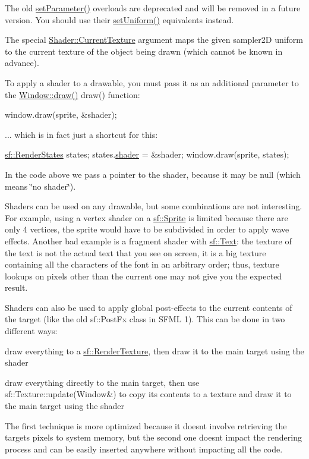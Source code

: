 The old \hyperlink{classsf_1_1_shader_a4d6ec78f6de1a0a2146c93ab09d7d762}{set\+Parameter()} overloads are deprecated and will be removed in a future version. You should use their \hyperlink{classsf_1_1_shader_abf78e3bea1e9b0bab850b6b0a0de29c7}{set\+Uniform()} equivalents instead.

The special \hyperlink{classsf_1_1_shader_ac84c7953eec2e19358ea6e2cc5385b8d}{Shader\+::\+Current\+Texture} argument maps the given {\ttfamily sampler2D} uniform to the current texture of the object being drawn (which cannot be known in advance).

To apply a shader to a drawable, you must pass it as an additional parameter to the \hyperlink{class_window_adfb2d5826942693e289d13f314a341f7}{Window\+::draw()} draw() function\+: 
\begin{DoxyCode}
window.draw(sprite, &shader);
\end{DoxyCode}


... which is in fact just a shortcut for this\+: 
\begin{DoxyCode}
\hyperlink{classsf_1_1_render_states}{sf::RenderStates} states;
states.\hyperlink{classsf_1_1_render_states_ad4f79ecdd0c60ed0d24fbe555b221bd8}{shader} = &shader;
window.draw(sprite, states);
\end{DoxyCode}


In the code above we pass a pointer to the shader, because it may be null (which means \char`\"{}no shader\char`\"{}).

Shaders can be used on any drawable, but some combinations are not interesting. For example, using a vertex shader on a \hyperlink{classsf_1_1_sprite}{sf\+::\+Sprite} is limited because there are only 4 vertices, the sprite would have to be subdivided in order to apply wave effects. Another bad example is a fragment shader with \hyperlink{classsf_1_1_text}{sf\+::\+Text}\+: the texture of the text is not the actual text that you see on screen, it is a big texture containing all the characters of the font in an arbitrary order; thus, texture lookups on pixels other than the current one may not give you the expected result.

Shaders can also be used to apply global post-\/effects to the current contents of the target (like the old sf\+::\+Post\+Fx class in S\+F\+ML 1). This can be done in two different ways\+: \begin{DoxyItemize}
\item draw everything to a \hyperlink{classsf_1_1_render_texture}{sf\+::\+Render\+Texture}, then draw it to the main target using the shader \item draw everything directly to the main target, then use sf\+::\+Texture\+::update(\+Window\&) to copy its contents to a texture and draw it to the main target using the shader\end{DoxyItemize}
The first technique is more optimized because it doesn\textquotesingle{}t involve retrieving the target\textquotesingle{}s pixels to system memory, but the second one doesn\textquotesingle{}t impact the rendering process and can be easily inserted anywhere without impacting all the code.

